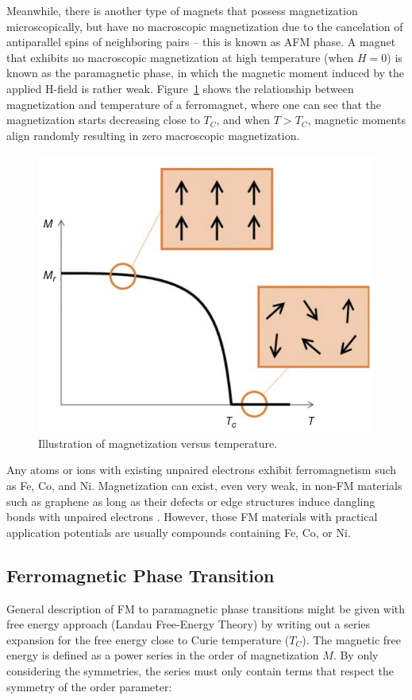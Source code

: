 Meanwhile, there is another type of magnets that possess magnetization
microscopically, but have no macroscopic magnetization due to the cancelation
of antiparallel spins of neighboring pairs – this is known as AFM phase.
A magnet that exhibits no macroscopic magnetization at high temperature (when $H = 0$) is known as the paramagnetic phase, in which the magnetic moment induced by the applied H-field is rather weak.
 Figure~\ref{fig:temp_mag} shows the relationship
between magnetization and temperature of a ferromagnet, where one can see
that the magnetization starts decreasing close to $T_C$, and when $T >T_C$, magnetic
moments align randomly resulting in zero macroscopic magnetization.
\begin{figure}[H]
	\centering
	\includegraphics{fig/review/temp_mag.png}
	\caption[Illustration of magnetization versus temperature.]{Illustration of magnetization versus temperature.}
\label{fig:temp_mag}
\end{figure}

Any atoms or ions with existing unpaired electrons exhibit ferromagnetism
such as Fe, Co, and Ni. Magnetization can exist, even very weak, in
non-FM materials such as graphene as long as their defects or edge
structures induce dangling bonds with unpaired electrons \cite{Ma:2012aa, Liu:2013aa}. However, those FM materials with practical application
potentials are usually compounds containing Fe, Co, or Ni.


\subsection{Ferromagnetic Phase Transition}
General description of FM to paramagnetic phase transitions might be given with free energy approach (Landau Free-Energy Theory) by writing out a series expansion for the
free energy close to Curie temperature ($T_C$). The magnetic free energy is defined
as a power series in the order of magnetization $M$. By only considering the symmetries, the series must only contain terms that respect the symmetry of the order parameter:

